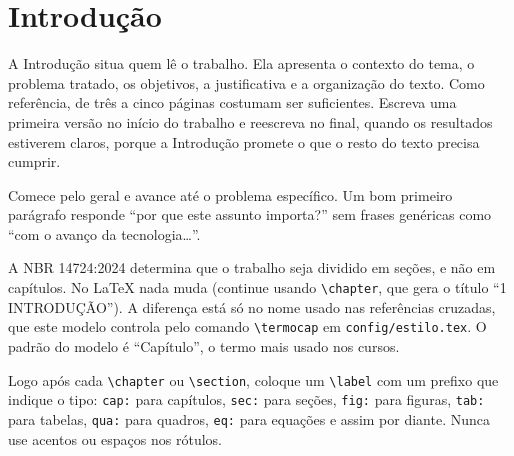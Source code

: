 \chapter{Introdução}
\label{cap:introducao}

\begin{instrucao}
A Introdução situa quem lê o trabalho. Ela apresenta o contexto do tema, o problema
tratado, os objetivos, a justificativa e a organização do texto. Como
referência, de três a cinco páginas costumam ser suficientes. Escreva uma
primeira versão no início do trabalho e reescreva no final, quando os
resultados estiverem claros, porque a Introdução promete o que o resto do texto
precisa cumprir.

Comece pelo geral e avance até o problema específico. Um bom primeiro parágrafo
responde ``por que este assunto importa?'' sem frases genéricas como ``com o
avanço da tecnologia\ldots''.

A NBR 14724:2024 determina que o trabalho seja dividido em seções, e não em
capítulos. No LaTeX nada muda (continue usando \verb|\chapter|, que gera o
título ``1 INTRODUÇÃO''). A diferença está só no nome usado nas referências
cruzadas, que este modelo controla pelo comando \verb|\termocap| em
\verb|config/estilo.tex|. O padrão do modelo é ``Capítulo'', o termo mais
usado nos cursos.

Logo após cada \verb|\chapter| ou \verb|\section|, coloque um
\verb|\label| com um prefixo que indique o tipo: \verb|cap:| para capítulos,
\verb|sec:| para seções, \verb|fig:| para figuras, \verb|tab:| para tabelas,
\verb|qua:| para quadros, \verb|eq:| para equações e assim por diante. Nunca
use acentos ou espaços nos rótulos.
\end{instrucao}

